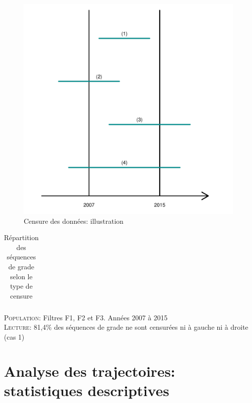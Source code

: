 \documentclass[11pt,a4paper]{article}
\begin{document}
\begin{figure}[H] 
  \caption{Censure des données: illustration}
  \label{censure} 
    \includegraphics[scale = 0.5]{schema_censoring.pdf} 
\end{figure}


\begin{table}[h!]
\centering
\caption{Répartition des séquences de grade selon le type de censure} 
\label{exit}
\begin{tabular}{lccccr}
  
   \hline
\bottomrule
\end{tabular}
\vspace{0.2cm}
\begin{minipage}{12cm}
\footnotesize
\textsc{Population:} Filtres F1, F2 et F3. Années 2007 à 2015 \\
\textsc{Lecture:} 81,4\% des séquences de grade ne sont censurées ni à gauche ni à droite (cas 1)
\end{minipage}
\end{table}
\medskip


\section{Analyse des trajectoires: statistiques descriptives}
\end{document}
